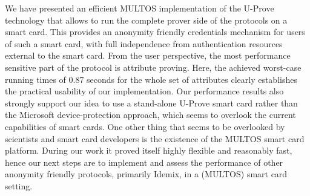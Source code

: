 We have presented an efficient MULTOS implementation of the U-Prove
technology that allows to run the complete prover side of the protocols
on a smart card. This provides an anonymity friendly credentials
mechanism for users of such a smart card, with full independence from
authentication resources external to the smart card. From the user
perspective, the most performance sensitive part of the protocol is
attribute proving. Here, the achieved worst-case running
times of 0.87 seconds for
the whole set of attributes clearly establishes the practical
usability of our implementation. Our performance results also strongly
support our idea to use a stand-alone U-Prove smart card rather than
the Microsoft device-protection approach, which seems to overlook the current
capabilities of smart cards. One other thing that seems to be overlooked by scientists and smart
card developers is the existence of the MULTOS smart card platform.
During our work it proved itself highly flexible and reasonably fast, hence our next steps
are to implement and assess the performance of other anonymity
friendly protocols, primarily Idemix, in a (MULTOS) smart card setting.

